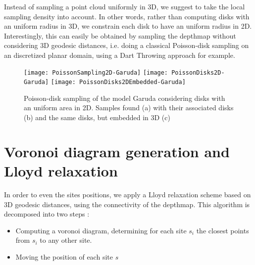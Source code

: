 \documentclass[11pt,fleqn]{book} %
\newcommand{\arnaud}[1]{\textcolor{red}{$<$ #1 $>$}}
\begin{document}
Instead of sampling a point cloud uniformly in 3D, we suggest to take the local sampling density into account. In other words, rather than computing disks with an uniform radius in 3D, we constrain each disk to have an uniform radius in 2D.
Interestingly, this can easily be obtained by sampling the depthmap without considering 3D geodesic distances, i.e. doing a classical Poisson-disk sampling on an discretized planar domain, using a Dart Throwing approach for example.

\begin{figure}[ht]
\centering
\texttt{[image: PoissonSampling2D-Garuda]}
\texttt{[image: PoissonDisks2D-Garuda]}
\texttt{[image: PoissonDisks2DEmbedded-Garuda]}
\caption{Poisson-disk sampling of the model Garuda considering disks with an uniform area in 2D. Samples found (a) with their associated disks (b) and the same disks, but embedded in 3D (c)}
\label{fig:poisson_sampling_2d}
\end{figure}



\section{Voronoi diagram generation and Lloyd relaxation}
\label{sec:lloyd_relaxation}

In order to even the sites positions, we apply a Lloyd relaxation scheme based on 3D geodesic distances, using the connectivity of the depthmap.
This algorithm is decomposed into two steps : 
\begin{itemize}
	\item Computing a voronoi diagram, determining for each site $s_i$ the closest points from $s_i$ to any other site.
	\item Moving the position of each site $s$
\end{itemize}
\end{document}
